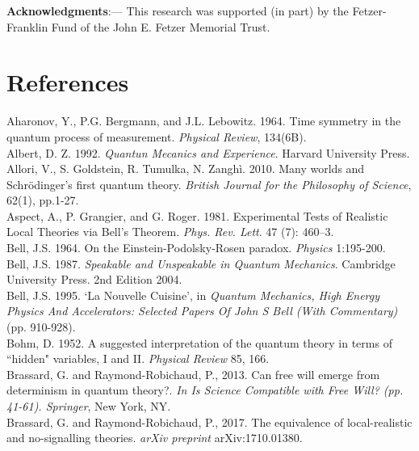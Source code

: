 \documentclass[a4paper]{article}
\begin{document}
\textbf{Acknowledgments}:---  This research was supported (in part) by the Fetzer-Franklin Fund of the John E. Fetzer Memorial Trust.

\section{References}
\indent

Aharonov, Y., P.G. Bergmann, and J.L. Lebowitz. 1964. Time symmetry in the quantum process of measurement. \textit{Physical Review}, 134(6B).\\

Albert, D. Z. 1992. \textit{Quantun Mecanics and Experience}. Harvard University Press. \\

Allori, V., S. Goldstein, R. Tumulka, N. Zanghì. 2010. Many worlds and Schrödinger’s first quantum theory. \textit{British Journal for the Philosophy of Science}, 62(1), pp.1-27.\\


Aspect, A., P. Grangier, and G. Roger. 1981. Experimental Tests of Realistic Local Theories via Bell's Theorem. \textit{Phys. Rev. Lett}. 47 (7): 460–3.\\

Bell, J.S. 1964. On the Einstein-Podolsky-Rosen paradox. \textit{Physics} 1:195-200.\\

Bell, J.S. 1987. \textit{Speakable and Unspeakable in Quantum Mechanics}. Cambridge University Press. 2nd Edition 2004.\\

Bell, J.S. 1995. `La Nouvelle Cuisine', in \textit{Quantum Mechanics, High Energy Physics And Accelerators: Selected Papers Of John S Bell (With Commentary)} (pp. 910-928).\\

Bohm, D. 1952. A suggested interpretation of the quantum theory in terms of ``hidden" variables, I and II. \textit{Physical Review} 85, 166.\\

Brassard, G. and Raymond-Robichaud, P., 2013. Can free will emerge from determinism in quantum theory?. \textit{In Is Science Compatible with Free Will? (pp. 41-61). Springer}, New York, NY.\\

Brassard, G. and Raymond-Robichaud, P., 2017. The equivalence of local-realistic and no-signalling theories. \textit{arXiv preprint} arXiv:1710.01380.\\
\end{document}
